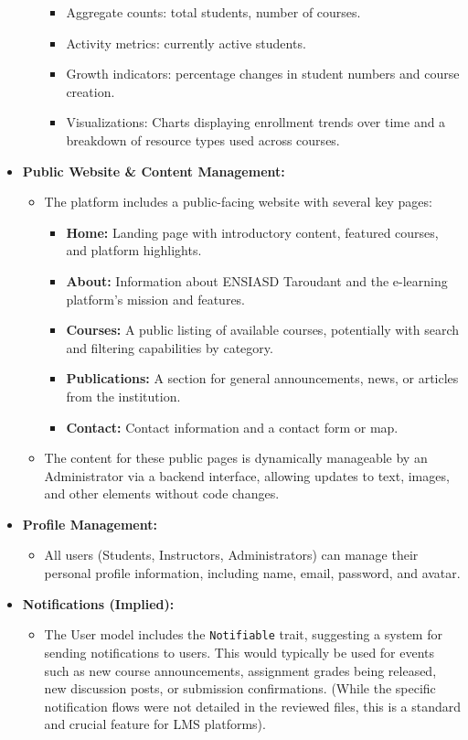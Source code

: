 \begin{itemize}
\begin{itemize}
        \begin{itemize}
            \item Aggregate counts: total students, number of courses.
            \item Activity metrics: currently active students.
            \item Growth indicators: percentage changes in student numbers and course creation.
            \item Visualizations: Charts displaying enrollment trends over time and a breakdown of resource types used across courses.
        \end{itemize}
    \end{itemize}
    \item \textbf{Public Website \& Content Management:}
    \begin{itemize}
        \item The platform includes a public-facing website with several key pages:
        \begin{itemize}
            \item \textbf{Home:} Landing page with introductory content, featured courses, and platform highlights.
            \item \textbf{About:} Information about ENSIASD Taroudant and the e-learning platform's mission and features.
            \item \textbf{Courses:} A public listing of available courses, potentially with search and filtering capabilities by category.
            \item \textbf{Publications:} A section for general announcements, news, or articles from the institution.
            \item \textbf{Contact:} Contact information and a contact form or map.
        \end{itemize}
        \item The content for these public pages is dynamically manageable by an Administrator via a backend interface, allowing updates to text, images, and other elements without code changes.
    \end{itemize}
    \item \textbf{Profile Management:}
    \begin{itemize}
        \item All users (Students, Instructors, Administrators) can manage their personal profile information, including name, email, password, and avatar.
    \end{itemize}
    \item \textbf{Notifications (Implied):}
    \begin{itemize}
        \item The User model includes the \texttt{Notifiable} trait, suggesting a system for sending notifications to users. This would typically be used for events such as new course announcements, assignment grades being released, new discussion posts, or submission confirmations. (While the specific notification flows were not detailed in the reviewed files, this is a standard and crucial feature for LMS platforms).
    \end{itemize}
\end{itemize}

